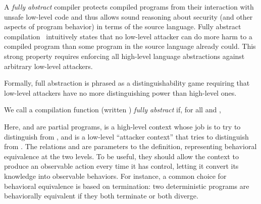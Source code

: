 \documentclass[10pt, conference, compsocconf, letterpaper, times]{IEEEtran}
\begin{document}
\ifsooner
{}
\fi

\label{sec:fa}

A {\em fully abstract} compiler protects compiled programs from their interaction
with unsafe low-level code and thus allows sound reasoning about security
(and other aspects of program behavior) in terms of the source language.
Fully abstract compilation~\cite{abadi_protection98}
intuitively states that no
low-level attacker can do more harm to a compiled program than some
program in the source language already could.
This strong property requires enforcing all high-level language
abstractions against arbitrary low-level attackers.


Formally, full abstraction is phrased as a distinguishability game
requiring that low-level attackers have no more distinguishing
power than high-level ones.

\begin{defn}\label{defn:fa-simple}
We call a compilation function (written ) {\em fully abstract}
if, for all  and ,

\end{defn}

\noindent Here,  and  are partial programs,  is a high-level
context whose job is to try to distinguish  from , and  is a
low-level ``attacker context'' that tries to distinguish  from
.
The relations  and  are parameters to the definition,
representing behavioral equivalence at the two levels.
To be useful, they should allow the context to produce an observable action
every time it has control, letting it convert its knowledge into
observable behaviors.
For instance, a common choice for behavioral equivalence is based on
termination: two deterministic programs are behaviorally equivalent if
they both terminate or both diverge.
\end{document}
